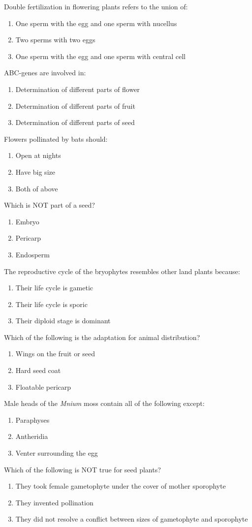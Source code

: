 \documentclass[letterpaper]{article}
\renewcommand{\_}{\mbox{}\hrulefill}
\newcommand{\be}{\begin{enumerate}}
\newcommand{\ee}{\end{enumerate}}
\begin{document}
\begin{multicols}{2}
\item Double fertilization in flowering plants refers to the union of:
	\be
	\item One sperm with the egg and one sperm with nucellus
	\item Two sperms with two eggs
	\item One sperm with the egg and one sperm with central cell
	\ee

\item ABC-genes are involved in:
	\be
	\item Determination of different parts of flower
	\item Determination of different parts of fruit
	\item Determination of different parts of seed
	\ee

\item Flowers pollinated by bats should:
	\be
	\item Open at nights
	\item Have big size
	\item Both of above
	\ee

\item Which is NOT part of a seed?
	\be
	\item Embryo
	\item Pericarp
	\item Endosperm
	\ee

\item The reproductive cycle of the bryophytes resembles other land plants because:
	\be
	\item Their life cycle is gametic
	\item Their life cycle is sporic
	\item Their diploid stage is dominant
	\ee

\item Which of the following is the adaptation for animal distribution?
	\be
	\item Wings on the fruit or seed
	\item Hard seed coat
	\item Floatable pericarp
	\ee

\item Male heads of the \textit{Mnium} moss contain all of the following except:
	\be
	\item Paraphyses
	\item Antheridia
	\item Venter surrounding the egg
	\ee

\item Which of the following is NOT true for seed plants?
	\be
	\item They took female gametophyte under the cover of mother sporophyte
	\item They invented pollination
	\item They did not resolve a conflict between sizes of gametophyte and sporophyte
	\ee


\end{multicols}
\end{document}
